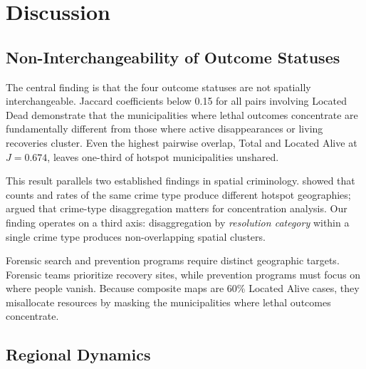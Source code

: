 \section{Discussion}
\label{sec:discussion}

\subsection{Non-Interchangeability of Outcome Statuses}
\label{sec:disc_noninterchangeability}

The central finding is that the four outcome statuses are not spatially interchangeable.
Jaccard coefficients below 0.15 for all pairs involving Located Dead demonstrate that the municipalities where lethal outcomes concentrate are fundamentally different from those where active disappearances or living recoveries cluster.
Even the highest pairwise overlap, Total and Located Alive at $J = 0.674$, leaves one-third of hotspot municipalities unshared.

This result parallels two established findings in spatial criminology.
\citet{andresen_2006} showed that counts and rates of the same crime type produce different hotspot geographies; \citet{braga_law_2017} argued that crime-type disaggregation matters for concentration analysis.
Our finding operates on a third axis: disaggregation by \emph{resolution category} within a single crime type produces non-overlapping spatial clusters.

Forensic search and prevention programs require distinct geographic targets. Forensic teams prioritize recovery sites, while prevention programs must focus on where people vanish. Because composite maps are 60\% Located Alive cases, they misallocate resources by masking the municipalities where lethal outcomes concentrate.

\subsection{Regional Dynamics}
\label{sec:disc_regional}

